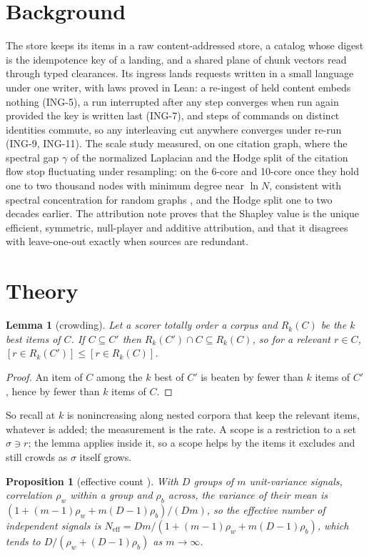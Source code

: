 \documentclass[11pt]{article}
\theoremstyle{plain}
\newtheorem{lemma}[theorem]{Lemma}
\newtheorem{proposition}[theorem]{Proposition}
\theoremstyle{definition}
\theoremstyle{remark}
\begin{document}
\section{Background}
The store keeps its items in a raw content-addressed store, a catalog whose digest is the idempotence
key of a landing, and a shared plane of chunk vectors read through typed clearances. Its ingress lands
requests written in a small language under one writer, with laws proved in Lean: a re-ingest of held
content embeds nothing (ING-5), a run interrupted after any step converges when run again provided the
key is written last (ING-7), and steps of commands on distinct identities commute, so any interleaving
cut anywhere converges under re-run (ING-9, ING-11). The scale study measured, on one citation graph,
where the spectral gap $\gamma$ of the normalized Laplacian and the Hodge split \citep{jiang2011hodgerank}
of the citation flow stop fluctuating under resampling: on the 6-core and 10-core
\citep{seidman1983cores} once they hold one to two thousand nodes with minimum degree near $\ln N$,
consistent with spectral concentration for random graphs \citep{chung2011spectra}, and the Hodge split
one to two decades earlier. The attribution note proves that the Shapley value \citep{shapley1953value}
is the unique efficient, symmetric, null-player and additive attribution, and that it disagrees with
leave-one-out exactly when sources are redundant.

\section{Theory}\label{sec:theory}
\begin{lemma}[crowding]
Let a scorer totally order a corpus and $R_k(C)$ be the $k$ best items of $C$. If $C\subseteq C'$
then $R_k(C')\cap C\subseteq R_k(C)$, so for a relevant $r\in C$, $[r\in R_k(C')]\le[r\in R_k(C)]$.
\end{lemma}
\begin{proof}
An item of $C$ among the $k$ best of $C'$ is beaten by fewer than $k$ items of $C'$, hence by fewer
than $k$ items of $C$.
\end{proof}
So recall at $k$ is nonincreasing along nested corpora that keep the relevant items, whatever is
added; the measurement is the rate. A scope is a restriction to a set $\sigma\ni r$; the lemma applies
inside it, so a scope helps by the items it excludes and still crowds as $\sigma$ itself grows.

\begin{proposition}[effective count \citep{kish1965}]
With $D$ groups of $m$ unit-variance signals, correlation $\rho_w$ within a group and $\rho_b$ across,
the variance of their mean is $(1+(m-1)\rho_w+m(D-1)\rho_b)/(Dm)$, so the effective number of
independent signals is $N_{\mathrm{eff}} = Dm/(1+(m-1)\rho_w+m(D-1)\rho_b)$, which tends to
$D/(\rho_w+(D-1)\rho_b)$ as $m\to\infty$.
\end{proposition}
\end{document}
